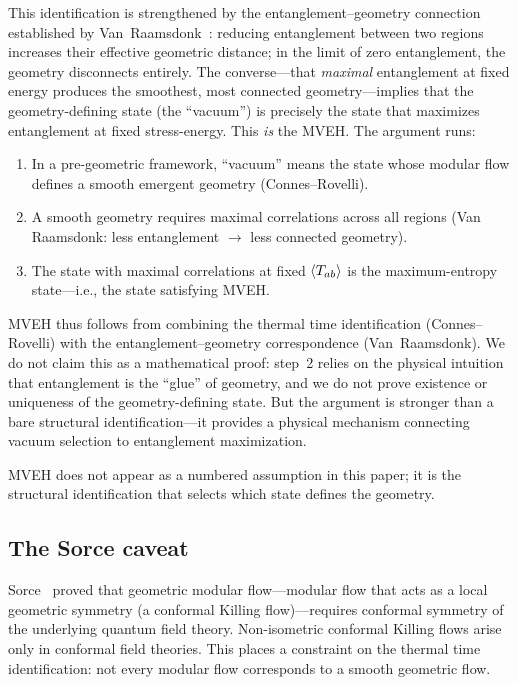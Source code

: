 This identification is strengthened by the
entanglement--geometry connection established by
Van~Raamsdonk~\cite{VanRaamsdonk2010}: reducing entanglement between
two regions increases their effective geometric distance; in the limit
of zero entanglement, the geometry disconnects entirely.  The
converse---that \emph{maximal} entanglement at fixed energy produces
the smoothest, most connected geometry---implies that the
geometry-defining state (the ``vacuum'') is precisely the state that
maximizes entanglement at fixed stress-energy.  This \emph{is} the
MVEH.  The argument runs:
\begin{enumerate}
\item In a pre-geometric framework, ``vacuum'' means the state whose
  modular flow defines a smooth emergent geometry (Connes--Rovelli).
\item A smooth geometry requires maximal correlations across all regions
  (Van Raamsdonk: less entanglement $\to$ less connected geometry).
\item The state with maximal correlations at fixed
  $\langle T_{ab}\rangle$ is the maximum-entropy state---i.e., the state
  satisfying MVEH.
\end{enumerate}
MVEH thus follows from combining the thermal time identification
(Connes--Rovelli) with the entanglement--geometry correspondence
(Van~Raamsdonk).  We do not claim this as a mathematical proof:
step~2 relies on the physical intuition that entanglement is the
``glue'' of geometry, and we do not prove existence or uniqueness of
the geometry-defining state.  But the argument is stronger than a bare
structural identification---it provides a physical mechanism
connecting vacuum selection to entanglement maximization.

MVEH does not appear as a numbered assumption in this paper; it is
the structural identification that selects which state defines the
geometry.

\subsection{The Sorce caveat}
\label{sec:sorce}

Sorce~\cite{Sorce2024} proved that geometric modular flow---modular
flow that acts as a local geometric symmetry (a conformal Killing
flow)---requires conformal symmetry of the underlying quantum field
theory.  Non-isometric conformal Killing flows arise only in conformal
field theories.  This places a constraint on the thermal time
identification: not every modular flow corresponds to a smooth
geometric flow.

